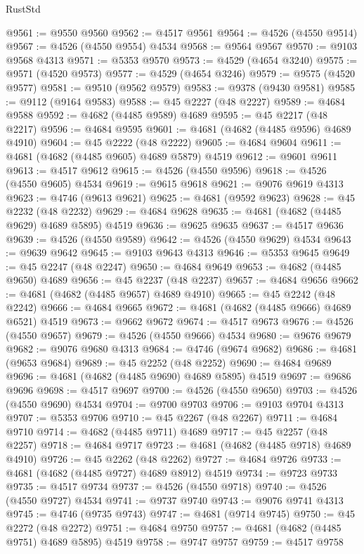\begin{lexlean}{RustStd}
\begin{coremodule}
@9561 := @9550 @9560
@9562 := @4517 @9561
@9564 := @4526 (@4550 @9514)
@9567 := @4526 (@4550 @9554) @4534
@9568 := @9564 @9567
@9570 := @9103 @9568 @4313
@9571 := @5353 @9570
@9573 := @4529 (@4654 @3240)
@9575 := @9571 (@4520 @9573)
@9577 := @4529 (@4654 @3246)
@9579 := @9575 (@4520 @9577)
@9581 := @9510 (@9562 @9579)
@9583 := @9378 (@9430 @9581)
@9585 := @9112 (@9164 @9583)
@9588 := @45 @2227 (@48 @2227)
@9589 := @4684 @9588
@9592 := @4682 (@4485 @9589) @4689
@9595 := @45 @2217 (@48 @2217)
@9596 := @4684 @9595
@9601 := @4681 (@4682 (@4485 @9596) @4689 @4910)
@9604 := @45 @2222 (@48 @2222)
@9605 := @4684 @9604
@9611 := @4681 (@4682 (@4485 @9605) @4689 @5879) @4519
@9612 := @9601 @9611
@9613 := @4517 @9612
@9615 := @4526 (@4550 @9596)
@9618 := @4526 (@4550 @9605) @4534
@9619 := @9615 @9618
@9621 := @9076 @9619 @4313
@9623 := @4746 (@9613 @9621)
@9625 := @4681 (@9592 @9623)
@9628 := @45 @2232 (@48 @2232)
@9629 := @4684 @9628
@9635 := @4681 (@4682 (@4485 @9629) @4689 @5895) @4519
@9636 := @9625 @9635
@9637 := @4517 @9636
@9639 := @4526 (@4550 @9589)
@9642 := @4526 (@4550 @9629) @4534
@9643 := @9639 @9642
@9645 := @9103 @9643 @4313
@9646 := @5353 @9645
@9649 := @45 @2247 (@48 @2247)
@9650 := @4684 @9649
@9653 := @4682 (@4485 @9650) @4689
@9656 := @45 @2237 (@48 @2237)
@9657 := @4684 @9656
@9662 := @4681 (@4682 (@4485 @9657) @4689 @4910)
@9665 := @45 @2242 (@48 @2242)
@9666 := @4684 @9665
@9672 := @4681 (@4682 (@4485 @9666) @4689 @6521) @4519
@9673 := @9662 @9672
@9674 := @4517 @9673
@9676 := @4526 (@4550 @9657)
@9679 := @4526 (@4550 @9666) @4534
@9680 := @9676 @9679
@9682 := @9076 @9680 @4313
@9684 := @4746 (@9674 @9682)
@9686 := @4681 (@9653 @9684)
@9689 := @45 @2252 (@48 @2252)
@9690 := @4684 @9689
@9696 := @4681 (@4682 (@4485 @9690) @4689 @5895) @4519
@9697 := @9686 @9696
@9698 := @4517 @9697
@9700 := @4526 (@4550 @9650)
@9703 := @4526 (@4550 @9690) @4534
@9704 := @9700 @9703
@9706 := @9103 @9704 @4313
@9707 := @5353 @9706
@9710 := @45 @2267 (@48 @2267)
@9711 := @4684 @9710
@9714 := @4682 (@4485 @9711) @4689
@9717 := @45 @2257 (@48 @2257)
@9718 := @4684 @9717
@9723 := @4681 (@4682 (@4485 @9718) @4689 @4910)
@9726 := @45 @2262 (@48 @2262)
@9727 := @4684 @9726
@9733 := @4681 (@4682 (@4485 @9727) @4689 @8912) @4519
@9734 := @9723 @9733
@9735 := @4517 @9734
@9737 := @4526 (@4550 @9718)
@9740 := @4526 (@4550 @9727) @4534
@9741 := @9737 @9740
@9743 := @9076 @9741 @4313
@9745 := @4746 (@9735 @9743)
@9747 := @4681 (@9714 @9745)
@9750 := @45 @2272 (@48 @2272)
@9751 := @4684 @9750
@9757 := @4681 (@4682 (@4485 @9751) @4689 @5895) @4519
@9758 := @9747 @9757
@9759 := @4517 @9758

\end{coremodule}
\end{lexlean}
